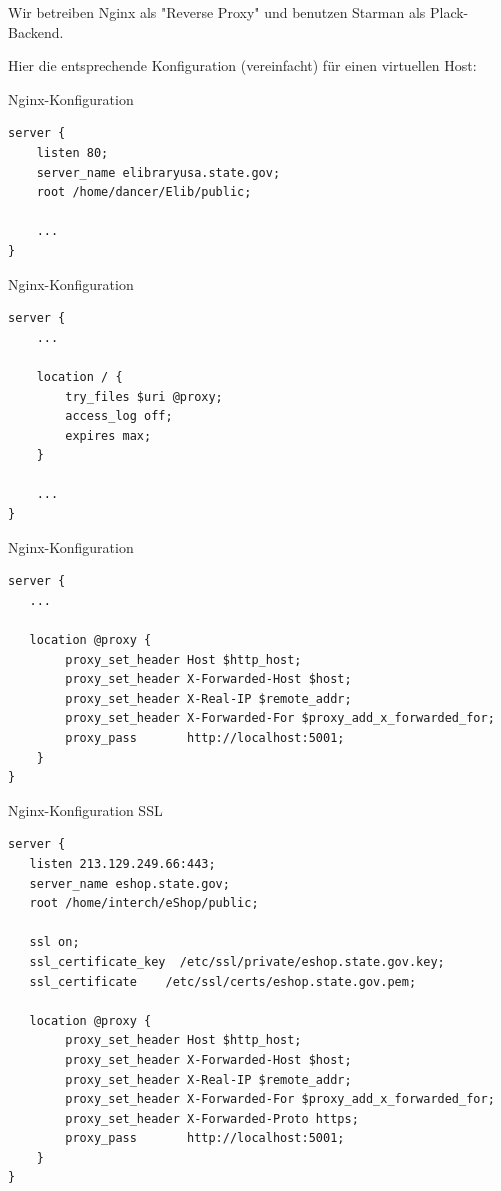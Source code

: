 Wir betreiben Nginx als "Reverse Proxy" und benutzen Starman als
Plack-Backend.

Hier die entsprechende Konfiguration (vereinfacht) für einen virtuellen
Host:

\begin{frame}[fragile]{Nginx-Konfiguration}
\begin{lstlisting}
server {
    listen 80;
    server_name elibraryusa.state.gov;
    root /home/dancer/Elib/public;

    ...
}
\end{lstlisting}
\end{frame}

\begin{frame}[fragile]{Nginx-Konfiguration}
\begin{lstlisting}
server {
    ...

    location / {
        try_files $uri @proxy;
        access_log off;
        expires max;
    }

    ...
}
\end{lstlisting}
\end{frame}

\begin{frame}[fragile]{Nginx-Konfiguration}
\begin{lstlisting}
server {
   ...

   location @proxy {
        proxy_set_header Host $http_host;
        proxy_set_header X-Forwarded-Host $host;
        proxy_set_header X-Real-IP $remote_addr;
        proxy_set_header X-Forwarded-For $proxy_add_x_forwarded_for;
        proxy_pass       http://localhost:5001;
    }
}
\end{lstlisting}
\end{frame}

\begin{frame}[fragile]{Nginx-Konfiguration SSL}
\begin{lstlisting}
server {
   listen 213.129.249.66:443;
   server_name eshop.state.gov;
   root /home/interch/eShop/public;

   ssl on;
   ssl_certificate_key  /etc/ssl/private/eshop.state.gov.key;
   ssl_certificate    /etc/ssl/certs/eshop.state.gov.pem;

   location @proxy {
        proxy_set_header Host $http_host;
        proxy_set_header X-Forwarded-Host $host;
        proxy_set_header X-Real-IP $remote_addr;
        proxy_set_header X-Forwarded-For $proxy_add_x_forwarded_for;
        proxy_set_header X-Forwarded-Proto https;
        proxy_pass       http://localhost:5001;
    }
}
\end{lstlisting}
\end{frame}



